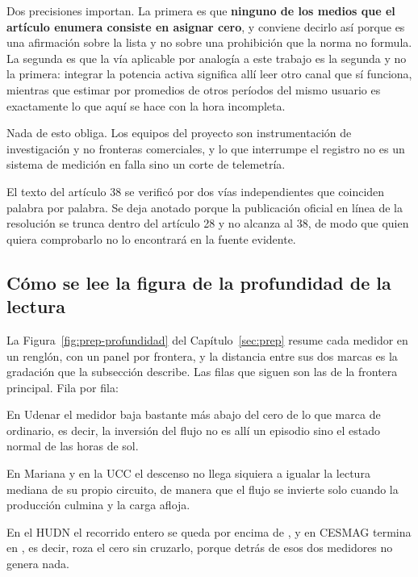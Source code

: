 Dos precisiones importan. La primera es que \textbf{ninguno de los medios
que el artículo enumera consiste en asignar cero}, y conviene decirlo así
porque es una afirmación sobre la lista y no sobre una prohibición que la
norma no formula. La segunda es que la vía aplicable por analogía a este
trabajo es la segunda y no la primera: integrar la potencia activa significa
allí leer otro canal que sí funciona, mientras que estimar por promedios de
otros períodos del mismo usuario es exactamente lo que aquí se hace con la
hora incompleta.

Nada de esto obliga. Los equipos del proyecto son instrumentación de
investigación y no fronteras comerciales, y lo que interrumpe el registro no
es un sistema de medición en falla sino un corte de telemetría.

El texto del artículo 38 se verificó por dos vías independientes que
coinciden palabra por palabra. Se deja anotado porque la publicación oficial
en línea de la resolución se trunca dentro del artículo 28 y no alcanza al
38, de modo que quien quiera comprobarlo no lo encontrará en la fuente
evidente.

\subsection{Cómo se lee la figura de la profundidad de la lectura}
\label{sub:repro-profundidad}

La Figura~\ref{fig:prep-profundidad} del Capítulo~\ref{sec:prep} resume
cada medidor en un renglón, con un panel por frontera, y la distancia entre
sus dos marcas es la gradación que la subsección describe. Las filas que
siguen son las de la frontera principal.
Fila por fila:

En Udenar el medidor baja bastante más abajo del cero de lo que marca de
ordinario, es decir, la inversión del flujo no es allí un episodio sino el
estado normal de las horas de sol.

En Mariana y en la UCC el descenso no llega siquiera a igualar la lectura
mediana de su propio circuito, de manera que el flujo se invierte solo
cuando la producción culmina y la carga afloja.

En el HUDN el recorrido entero se queda por encima de , y en
CESMAG termina en , es decir, roza el cero sin cruzarlo,
porque detrás de esos dos medidores no genera nada.

